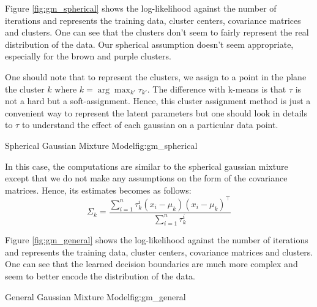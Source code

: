 \documentclass{article}
\begin{document}
Figure \ref{fig:gm_spherical} shows the log-likelihood against the number of iterations and represents the training data, cluster centers, covariance matrices and clusters. One can see that the clusters don't seem to fairly represent the real distribution of the data. Our spherical assumption doesn't seem appropriate, especially for the brown and purple clusters.

One should note that to represent the clusters, we assign to a point in the plane the cluster $k$ where $k = \arg\max_{k'} \tau_{k'}$. The difference with k-means is that $\tau$ is not a hard but a soft-assignment. Hence, this cluster assignment method is just a convenient way to represent the latent parameters but one should look in details to $\tau$ to understand the effect of each gaussian on a particular data point.

          {}
          {Spherical Gaussian Mixture Model}{fig:gm_spherical}


In this case, the computations are similar to the spherical gaussian mixture except that we do not make any assumptions on the form of the covariance matrices. Hence, its estimates becomes as follows:
$$
\Sigma_k = \frac{\sum_{i=1}^n \tau_k^i (x_i - \mu_k)(x_i - \mu_k)^\intercal}{\sum_{i=1}^n \tau_k^i}
$$

Figure \ref{fig:gm_general} shows the log-likelihood against the number of iterations and represents the training data, cluster centers, covariance matrices and clusters. One can see that the learned decision boundaries are much more complex and seem to better encode the distribution of the data.

          {}
          {General Gaussian Mixture Model}{fig:gm_general}

\end{document}
